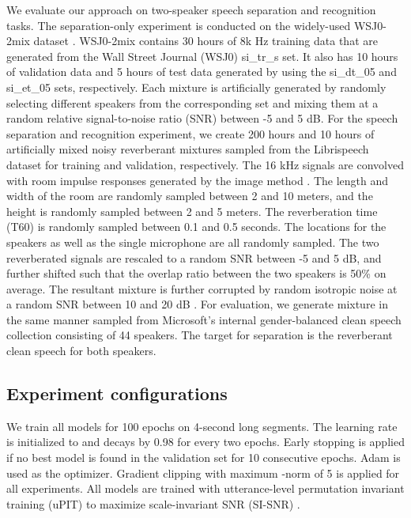 \documentclass{article}
\begin{document}
We evaluate our approach on two-speaker speech separation and recognition tasks. The separation-only experiment is conducted on the widely-used WSJ0-2mix dataset \cite{hershey2016deep}. WSJ0-2mix contains 30 hours of 8k Hz training data that are generated from the Wall Street Journal (WSJ0) si\_tr\_s set. It also has 10 hours of validation data and 5 hours of test data generated by using the si\_dt\_05 and si\_et\_05 sets, respectively. Each mixture is artificially generated by randomly selecting different speakers from the corresponding set and mixing them at a random relative signal-to-noise ratio (SNR) between -5 and 5 dB. For the speech separation and recognition experiment, we create 200 hours and 10 hours of artificially mixed noisy reverberant mixtures sampled from the Librispeech dataset \cite{panayotov2015librispeech} for training and validation, respectively. The 16 kHz signals are convolved with room impulse responses generated by the image method \cite{allen1979image}. The length and width of the room are randomly sampled between 2 and 10 meters, and the height is randomly sampled between 2 and 5 meters. The reverberation time (T60) is randomly sampled between 0.1 and 0.5 seconds. The locations for the speakers as well as the single microphone are all randomly sampled. The two reverberated signals are rescaled to a random SNR between -5 and 5 dB, and further shifted such that the overlap ratio between the two speakers is 50\% on average. The resultant mixture is further corrupted by random isotropic noise at a random SNR between 10 and 20 dB \cite{habets2007generating}. For evaluation, we generate mixture in the same manner sampled from Microsoft's internal gender-balanced clean speech collection consisting of 44 speakers. The target for separation is the reverberant clean speech for both speakers.

\subsection{Experiment configurations}

We train all models for 100 epochs on 4-second long segments. The learning rate is initialized to  and decays by 0.98 for every two epochs. Early stopping is applied if no best model is found in the validation set for 10 consecutive epochs. Adam \cite{kingma2014adam} is used as the optimizer. Gradient clipping with maximum -norm of 5 is applied for all experiments. All models are trained with utterance-level permutation invariant training (uPIT) \cite{kolbaek2017multitalker} to maximize scale-invariant SNR (SI-SNR) \cite{le2019sdr}.
\end{document}
